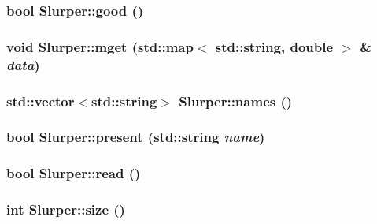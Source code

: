 \hypertarget{classSlurper_a3}{
\subsubsection[good]{\setlength{\rightskip}{0pt plus 5cm}bool Slurper::good ()}}
\label{classSlurper_a3}


\hypertarget{classSlurper_a8}{
\subsubsection[mget]{\setlength{\rightskip}{0pt plus 5cm}void Slurper::mget (std::map$<$ std::string, double $>$ \& {\em data})}}
\label{classSlurper_a8}


\hypertarget{classSlurper_a12}{
\subsubsection[names]{\setlength{\rightskip}{0pt plus 5cm}std::vector$<$std::string$>$ Slurper::names ()}}
\label{classSlurper_a12}


\hypertarget{classSlurper_a13}{
\subsubsection[present]{\setlength{\rightskip}{0pt plus 5cm}bool Slurper::present (std::string {\em name})}}
\label{classSlurper_a13}


\hypertarget{classSlurper_a5}{
\subsubsection[read]{\setlength{\rightskip}{0pt plus 5cm}bool Slurper::read ()}}
\label{classSlurper_a5}


\hypertarget{classSlurper_a10}{
\subsubsection[size]{\setlength{\rightskip}{0pt plus 5cm}int Slurper::size ()}}
\label{classSlurper_a10}


